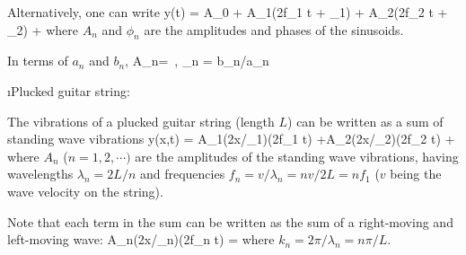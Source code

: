 Alternatively, one can write
%
\be
y(t) = A_0 
+ A_1\sin(2\pi f_1 t + \phi_1) 
+ A_2\sin(2\pi f_2 t + \phi_2) 
+ \cdots
\ee
%
where
$A_n$ and $\phi_n$ are the amplitudes and phases of the 
sinusoids.

In terms of $a_n$ and $b_n$,
%
\be
A_n= \,,\quad
\tan\phi_n = b_n/a_n
\ee

\i Plucked guitar string:

The vibrations of a plucked guitar string (length $L$)
can be written as a sum of standing wave vibrations
%
\be
y(x,t) = 
A_1\sin(2\pi x/\lambda_1)\cos(2\pi f_1 t) 
+A_2\sin(2\pi x/\lambda_2)\cos(2\pi f_2 t)
+\cdots
\ee
%
where $A_n$ ($n=1,2,\cdots)$
are the amplitudes of the standing wave vibrations, 
having wavelengths 
$\lambda_n = 2L/n$ and frequencies 
$f_n = v/\lambda_n=nv/2L = nf_1$ 
($v$ being the wave velocity on the string). 

Note that each term in the sum can be written as the
sum of a right-moving and left-moving wave:
%
\be
A_n\sin(2\pi x/\lambda_n)\cos(2\pi f_n t)
= 
\ee
%
where $k_n= 2\pi/\lambda_n = n\pi/L$.

\ei

